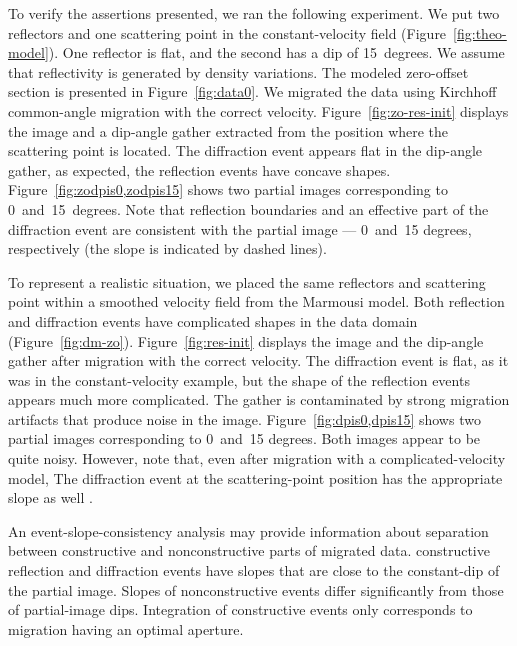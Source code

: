To verify the assertions presented, we ran the following experiment. We put two reflectors and one scattering point in the constant-velocity field
(Figure~\ref{fig:theo-model}). One reflector is flat, and the second has a dip of 15~degrees. We assume that reflectivity is generated
by density variations. The modeled zero-offset section is presented in Figure~\ref{fig:data0}. We migrated the data using Kirchhoff common-angle
migration with the correct velocity. Figure~\ref{fig:zo-res-init} displays the image and a dip-angle gather extracted from 
the position where the scattering point is located. The diffraction event appears flat in the dip-angle gather, as expected,  the reflection
events have concave shapes. Figure~\ref{fig:zodpis0,zodpis15} shows two partial images corresponding to 0~and~15~degrees.
Note that reflection boundaries and an effective part of the diffraction event are consistent with the partial image --- 0~and~15 degrees, 
respectively (the slope is indicated by dashed lines).

To represent a realistic situation, we placed the same reflectors and scattering point within a smoothed velocity field from the Marmousi model.
Both reflection and diffraction events have complicated shapes in the data domain (Figure~\ref{fig:dm-zo}). Figure~\ref{fig:res-init}
displays the image and the dip-angle gather after migration with the correct velocity.  The diffraction event is flat, as it was in the
constant-velocity example, but the shape of the reflection events appears much more complicated. The gather is contaminated by strong
migration artifacts that produce noise in the image. Figure~\ref{fig:dpis0,dpis15} shows two partial images corresponding to 0~and~15 degrees.
Both images appear to be quite noisy. However, note that, even after migration with a complicated-velocity model,  The diffraction event at the scattering-point position has the appropriate slope as well . 

An event-slope-consistency analysis may provide information about separation between constructive
and nonconstructive parts of migrated data.  constructive reflection and diffraction events have slopes
that are close to the constant-dip of the partial image. Slopes of nonconstructive events differ significantly from those of partial-image
dips. Integration of constructive events only corresponds to migration having an optimal
aperture.

